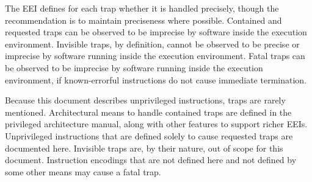 The EEI defines for each trap whether it is handled precisely, though
the recommendation is to maintain preciseness where possible.
Contained and requested traps can be observed to be imprecise by
software inside the execution environment.  Invisible traps, by
definition, cannot be observed to be precise or imprecise by software
running inside the execution environment.  Fatal traps can be observed
to be imprecise by software running inside the execution environment,
if known-errorful instructions do not cause immediate termination.

Because this document describes unprivileged instructions, traps are
rarely mentioned.  Architectural means to handle contained traps are
defined in the privileged architecture manual, along with other
features to support richer EEIs.  Unprivileged instructions that are
defined solely to cause requested traps are documented here.
Invisible traps are, by their nature, out of scope for this document.
Instruction encodings that are not defined here and not defined by
some other means may cause a fatal trap.
